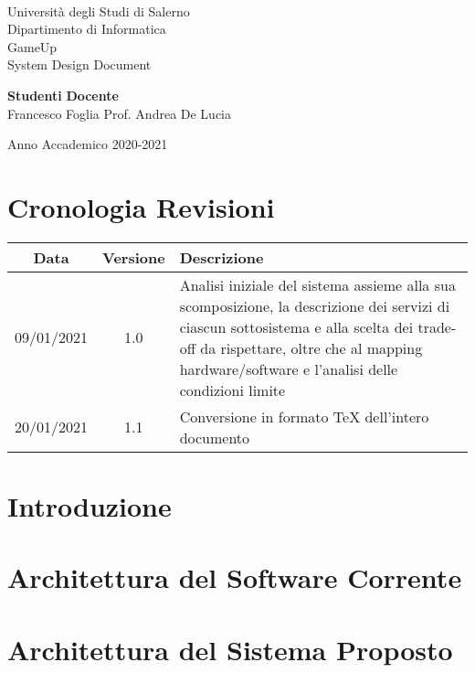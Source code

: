 \documentclass[11pt,oneside]{book}
\begin{document}

\begin{titlepage}
\begin{center}
\\[0.2truecm]
{\Large Universit\`a degli Studi di Salerno}\\[0.2truecm]
{\large Dipartimento di Informatica}\\
\hrulefill
\vfill
{\Large GameUp }\\[0.2truecm]
\vfill\vfill
{\Huge System Design Document}
\vfill\vfill


{\bf Studenti} \hfill {\bf Docente}\ \ \\
Francesco Foglia \hfill Prof. Andrea De Lucia\\

\vfill
\hrulefill 

Anno Accademico 2020-2021

\end{center}
\end{titlepage}

\chapter*{Cronologia Revisioni}
\begin{center}
	\begin{tabular}{||c c p{10cm}||} 
	\hline
	Data & Versione & Descrizione \\ [0.5ex] 
	\hline\hline
	09/01/2021 & 1.0 & Analisi iniziale del sistema assieme alla sua scomposizione, la descrizione dei servizi di ciascun sottosistema e alla scelta dei trade-off da rispettare, oltre che al mapping hardware/software e l’analisi delle condizioni limite \\ 
	\hline
	20/01/2021 & 1.1 & Conversione in formato TeX dell'intero documento \\
	\hline
   \end{tabular}
\end{center}

\tableofcontents
\pagestyle{plain}

\chapter{Introduzione}
\setcounter{page}{1} 	%


\chapter{Architettura del Software Corrente}


\chapter{Architettura del Sistema Proposto}


\end{document}
